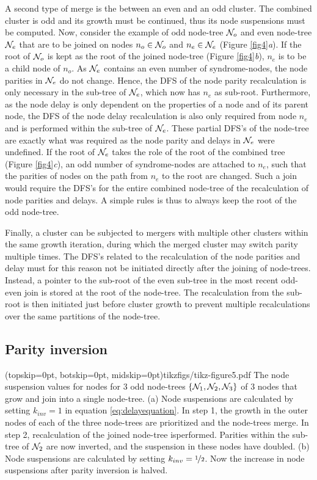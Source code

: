 A second type of merge is the between an even and an odd cluster. The combined cluster is odd and its growth must be continued, thus its node suspensions must be computed. Now, consider the example of odd node-tree $\mathcal{N}_o$ and even node-tree $\mathcal{N}_e$ that are to be joined on nodes $n_o\in \mathcal{N}_o$ and $n_e \in \mathcal{N}_e$ (Figure \ref{fig4}\emph{a}). If the root of $\mathcal{N}_o$ is kept as the root of the joined node-tree (Figure \ref{fig4}\emph{b}), $n_e$ is to be a child node of $n_o$. As $\mathcal{N}_e$ contains an even number of syndrome-nodes, the node parities in $\mathcal{N}_e$ do not change. Hence, the DFS of the node parity recalculation is only necessary in the sub-tree of $\mathcal{N}_e$, which now has $n_e$ as sub-root. Furthermore, as the node delay is only dependent on the properties of a node and of its parent node, the DFS of the node delay recalculation is also only required from node $n_e$ and is performed within the sub-tree of $\mathcal{N}_e$. These partial DFS's of the node-tree are exactly what was required as the node parity and delays in $\mathcal{N}_e$ were undefined. If the root of $\mathcal{N}_e$ takes the role of the root of the combined tree (Figure \ref{fig4}\emph{c}), an odd number of syndrome-nodes are attached to $n_e$, such that the parities of nodes on the path from $n_e$ to the root are changed. Such a join would require the DFS's for the entire combined node-tree of the recalculation of node parities and delays. A simple rules is thus to always keep the root of the odd node-tree. 

Finally, a cluster can be subjected to mergers with multiple other clusters within the same growth iteration, during which the merged cluster may switch parity multiple times. The DFS's related to the recalculation of the node parities and delay must for this reason not be initiated directly after the joining of node-trees. Instead, a pointer to the sub-root of the even sub-tree in the most recent odd-even join is stored at the root of the node-tree. The recalculation from the sub-root is then initiated just before cluster growth to prevent multiple recalculations over the same partitions of the node-tree. 

\subsection{Parity inversion}\label{sec:inversion}
\Figure[htb](topskip=0pt, botskip=0pt, midskip=0pt){tikzfigs/tikz-figure5.pdf}{
    The node suspension values for nodes for 3 odd node-trees $\{\mathcal{N}_1, \mathcal{N}_2, \mathcal{N}_3\}$ of 3 nodes that grow and join into a single node-tree. (a)
    Node suspensions are calculated by setting $k_{inv}=1$ in equation \eqref{eq:delayequation}. In step 1, the growth in the outer nodes of each of the three node-trees are prioritized and the node-trees merge. In step 2, recalculation of the joined node-tree isperformed. Parities within the sub-tree of $\mathcal{N}_2$ are now inverted, and the suspension in these nodes have doubled. (b) Node suspensions are calculated by setting $k_{inv}=\nicefrac{1}{2}$. Now the increase in node suspensions after parity inversion is halved.\label{fig5}}


